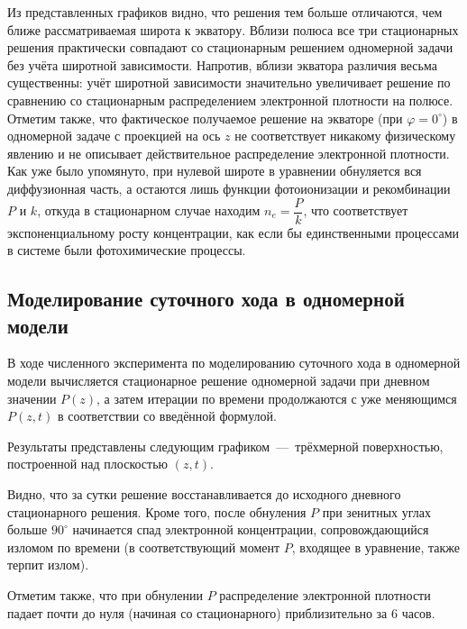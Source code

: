 \documentclass[14pt, a4paper, fleqn]{extarticle}
\begin{document}
Из представленных графиков видно, что решения тем больше отличаются, чем ближе рассматриваемая широта к экватору. Вблизи полюса все три стационарных решения практически совпадают со стационарным решением одномерной задачи без учёта широтной зависимости. Напротив, вблизи экватора различия весьма существенны: учёт широтной зависимости значительно увеличивает решение по сравнению со стационарным распределением электронной плотности на полюсе. Отметим также, что фактическое получаемое решение на экваторе (при $\varphi = 0^\circ$) в одномерной задаче с проекцией на ось $z$ не соответствует никакому физическому явлению и не описывает действительное распределение электронной плотности. Как уже было упомянуто, при нулевой широте в уравнении обнуляется вся диффузионная часть, а остаются лишь функции фотоионизации и рекомбинации $P$ и $k$, откуда в стационарном случае находим $n_e = \dfrac{P}{k}$, что соответствует экспоненциальному росту концентрации, как если бы единственными процессами в системе были фотохимические процессы.




\subsection{Моделирование суточного хода в одномерной модели}


В ходе численного эксперимента по моделированию суточного хода в одномерной модели вычисляется стационарное решение одномерной задачи при дневном значении $P(z)$, а затем итерации по времени продолжаются с уже меняющимся $P(z, t)$ в соответствии со введённой формулой.

Результаты представлены следующим графиком~---~трёхмерной поверхностью, построенной над плоскостью $(z, t)$.

Видно, что за сутки решение восстанавливается до исходного дневного стационарного решения. Кроме того, после обнуления $P$ при зенитных углах больше $90^\circ$ начинается спад электронной концентрации, сопровождающийся изломом по времени (в соответствующий момент $P$, входящее в уравнение, также терпит излом).

Отметим также, что при обнулении $P$ распределение электронной плотности падает почти до нуля (начиная со стационарного) приблизительно за $6$ часов.
\end{document}
